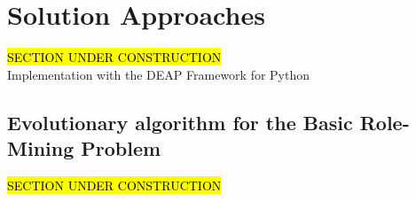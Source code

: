 \newpage
\section{Solution Approaches}
\hl{SECTION UNDER CONSTRUCTION}\\
Implementation with the DEAP Framework for Python \cite{DeRainville:2012}

\subsection{Evolutionary algorithm for the Basic Role-Mining Problem}
\hl{SECTION UNDER CONSTRUCTION}\\
